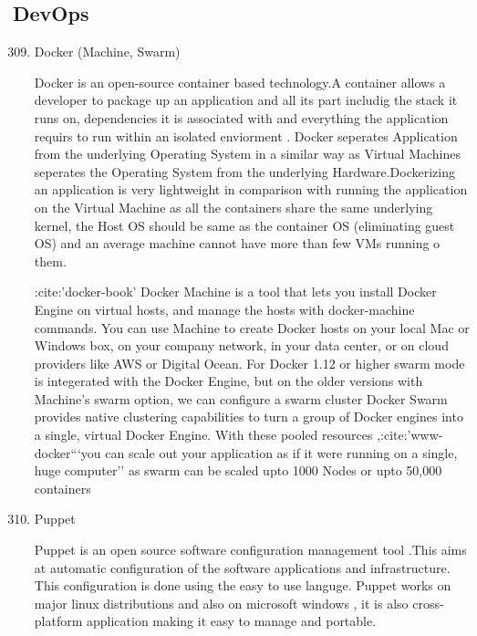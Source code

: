 \subsection{DevOps}
\label{\detokenize{i524/technologies:devops}}\begin{enumerate}
\setcounter{enumi}{308}
\item {} 
Docker (Machine, Swarm)

Docker is an open-source container based technology.A container
allows a developer to package up an application and all its part
includig the stack it runs on, dependencies it is associated with
and everything the application requirs to run within an isolated
enviorment . Docker seperates Application from the underlying
Operating System in a similar way as Virtual Machines seperates
the Operating System from the underlying Hardware.Dockerizing an
application is very lightweight in comparison with running the
application on the Virtual Machine as all the containers share
the same underlying kernel, the Host OS should be same as the
container OS (eliminating guest OS) and an average machine cannot
have more than few VMs running o them.

:cite:'docker-book' Docker Machine is a tool that lets you
install Docker Engine on virtual hosts, and manage the hosts with
docker-machine commands. You can use Machine to create Docker
hosts on your local Mac or Windows box, on your company network,
in your data center, or on cloud providers like AWS or Digital
Ocean. For Docker 1.12 or higher swarm mode is integerated with
the Docker Engine, but on the older versions with Machine's swarm
option, we can configure a swarm cluster Docker Swarm provides
native clustering capabilities to turn a group of Docker engines
into a single, virtual Docker Engine. With these pooled resources
,:cite:'www-docker```you can scale out your application as if it
were running on a single, huge computer'' as swarm can be scaled
upto 1000 Nodes or upto 50,000 containers

\item {} 
Puppet

Puppet is an open source software configuration management
tool \label{\detokenize{i524/technologies:id573}}{\hyperref[\detokenize{i524/technologies:www-puppet-wiki-puppet}]{\sphinxcrossref{{[}492{]}}}}.This aims at automatic
configuration of the software
applications and infrastructure. This configuration is done
using the easy to use languge.
Puppet works on major linux distributions and also on
microsoft windows ,
it is also cross-platform application making it easy to manage
and portable. \label{\detokenize{i524/technologies:id574}}{\hyperref[\detokenize{i524/technologies:www-puppet-puppet-site}]{\sphinxcrossref{{[}493{]}}}}


\end{enumerate}
